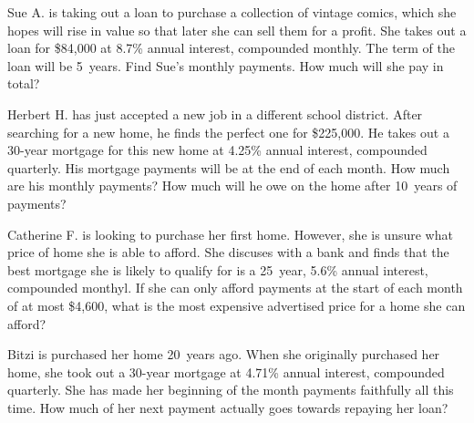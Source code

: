 \documentclass[11pt,letterpaper]{article}
\begin{document}

 Sue A. is taking out a loan to purchase a collection of vintage comics, which she hopes will rise in value so that later she can sell them for a profit. She takes out a loan for \$84,000 at 8.7\% annual interest, compounded monthly. The term of the loan will be 5~years. Find Sue's monthly payments. How much will she pay in total?



\newpage



 Herbert H. has just accepted a new job in a different school district. After searching for a new home, he finds the perfect one for \$225,000. He takes out a 30-year mortgage for this new home at 4.25\% annual interest, compounded quarterly. His mortgage payments will be at the end of each month. How much are his monthly payments? How much will he owe on the home after 10~years of payments?



\newpage



 Catherine F. is looking to purchase her first home. However, she is unsure what price of home she is able to afford. She discuses with a bank and finds that the best mortgage she is likely to qualify for is a 25~year, 5.6\% annual interest, compounded monthyl. If she can only afford payments at the start of each month of at most \$4,600, what is the most expensive advertised price for a home she can afford?



\newpage 



 Bitzi is purchased her home 20~years ago. When she originally purchased her home, she took out a 30-year mortgage at 4.71\% annual interest, compounded quarterly. She has made her beginning of the month payments faithfully all this time. How much of her next payment actually goes towards repaying her loan? 
\end{document}
